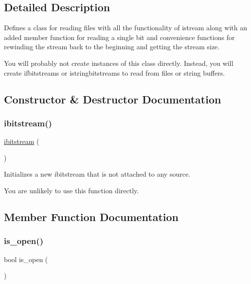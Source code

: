 \subsection{Detailed Description}
Defines a class for reading files with all the functionality of istream along with an added member function for reading a single bit and convenience functions for rewinding the stream back to the beginning and getting the stream size. 

You will probably not create instances of this class directly. Instead, you will create ifbitstreams or istringbitstreams to read from files or string buffers. 

\subsection{Constructor \& Destructor Documentation}
\mbox{\label{classibitstream_a72d1e7b784e2782d57a9ce3954a1f94f}} 
\subsubsection{\texorpdfstring{ibitstream()}{ibitstream()}}
{\footnotesize\ttfamily \mbox{\hyperlink{classibitstream}{ibitstream}} (\begin{DoxyParamCaption}{ }\end{DoxyParamCaption})}



Initializes a new ibitstream that is not attached to any source. 

You are unlikely to use this function directly. 

\subsection{Member Function Documentation}
\mbox{\label{classibitstream_a2f57f54d8c03b615bb31eee091d8a88a}} 
\subsubsection{\texorpdfstring{is\+\_\+open()}{is\_open()}}
{\footnotesize\ttfamily bool is\+\_\+open (\begin{DoxyParamCaption}{ }\end{DoxyParamCaption})\hspace{0.3cm}{\ttfamily [virtual]}}



